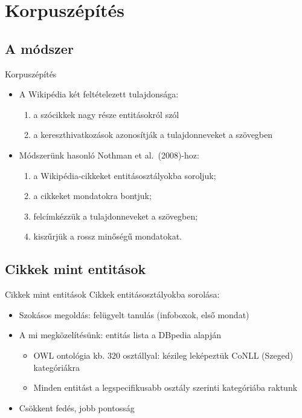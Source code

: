 \documentclass[utf8x,t]{beamer}
\newcommand{\vitem}{\item \vspace{4pt}}
\begin{document}
\section{Korpuszépítés}

\subsection*{A módszer}

\begin{frame}{Korpuszépítés}
  \begin{itemize}
  \vitem A Wikipédia két feltételezett tulajdonsága:
    \begin{enumerate}
    \vitem a szócikkek nagy része entitásokról szól
    \vitem a kereszthivatkozások azonosítják a tulajdonneveket a szövegben
    \end{enumerate}
  \vitem Módszerünk hasonló Nothman et al.~(2008)-hoz:
    \begin{enumerate}
    \vitem a Wikipédia-cikkeket entitásosztályokba soroljuk;
    \vitem a cikkeket mondatokra bontjuk;
    \vitem felcímkézzük a tulajdonneveket a szövegben;
    \vitem kiszűrjük a rossz minőségű mondatokat.
    \end{enumerate}
  \end{itemize}
\end{frame}

\subsection{Cikkek mint entitások}
\begin{frame}{Cikkek mint entitások}
  \bigskip
  Cikkek entitásosztályokba sorolása: %
  \smallskip
  \begin{itemize}
  \vitem Szokásos megoldás: felügyelt tanulás (infoboxok, első mondat)
  \vitem A mi megközelítésünk: entitás lista a DBpedia alapján
    \begin{itemize}
    \vitem OWL ontológia kb. 320 osztállyal: kézileg leképeztük CoNLL (Szeged) kategóriákra
    \vitem Minden entitást a legspecifikusabb osztály szerinti kategóriába raktunk
    \end{itemize}
  \item Csökkent fedés, jobb pontosság
  \end{itemize}
\end{frame}
\end{document}
